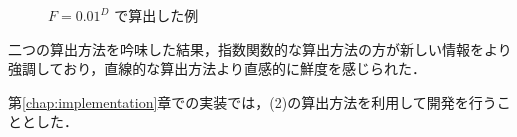 \begin{figure}[htbp]
  \begin{center}
  \end{center}
  \caption{$ F =  0.01 ^ D $ で算出した例}
\end{figure}

二つの算出方法を吟味した結果，指数関数的な算出方法の方が新しい情報をより強調しており，直線的な算出方法より直感的に鮮度を感じられた．

第\ref{chap:implementation}章での実装では，(2)の算出方法を利用して開発を行うこととした．
